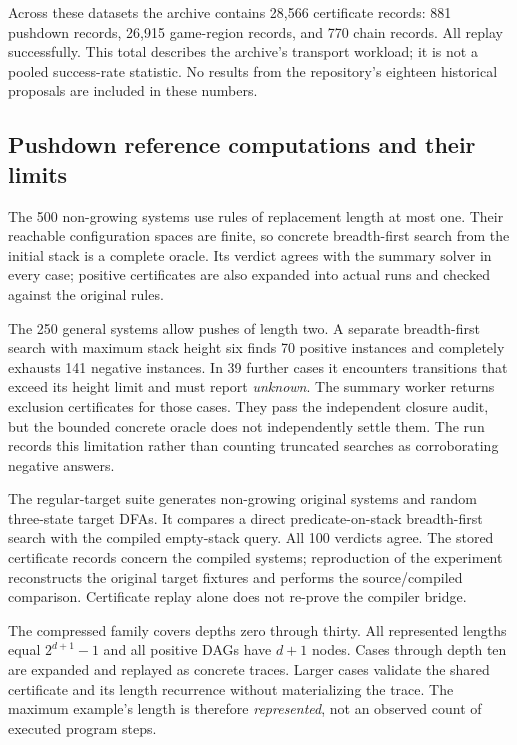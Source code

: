 Across these datasets the archive contains 28,566 certificate records:
881 pushdown records, 26,915 game-region records, and 770 chain records. All
replay successfully. This total describes the archive's transport workload;
it is not a pooled success-rate statistic. No results from the repository's
eighteen historical proposals are included in these numbers.

\subsection{Pushdown reference computations and their limits}
The 500 non-growing systems use rules of replacement length at most one. Their
reachable configuration spaces are finite, so concrete breadth-first search
from the initial stack is a complete oracle. Its verdict agrees with the
summary solver in every case; positive certificates are also expanded into
actual runs and checked against the original rules.

The 250 general systems allow pushes of length two. A separate breadth-first
search with maximum stack height six finds 70 positive instances and completely
exhausts 141 negative instances. In 39 further cases it encounters transitions
that exceed its height limit and must report \emph{unknown}. The summary worker
returns exclusion certificates for those cases. They pass the independent
closure audit, but the bounded concrete oracle does not independently settle
them. The run records this limitation rather than counting truncated searches
as corroborating negative answers.

The regular-target suite generates non-growing original systems and random
three-state target DFAs. It compares a direct predicate-on-stack breadth-first
search with the compiled empty-stack query. All 100 verdicts agree. The stored
certificate records concern the compiled systems; reproduction of the
experiment reconstructs the original target fixtures and performs the
source/compiled comparison. Certificate replay alone does not re-prove the
compiler bridge.

The compressed family covers depths zero through thirty. All represented
lengths equal $2^{d+1}-1$ and all positive DAGs have $d+1$ nodes. Cases through
depth ten are expanded and replayed as concrete traces. Larger cases validate
the shared certificate and its length recurrence without materializing the
trace. The maximum example's length is therefore \emph{represented}, not an
observed count of executed program steps.

